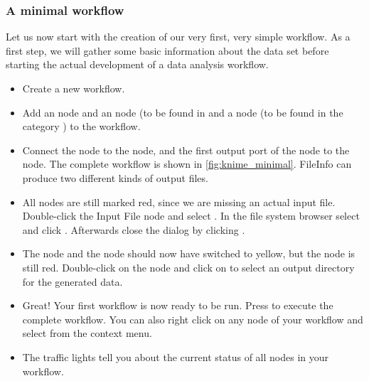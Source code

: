 \subsubsection{A minimal workflow}
\label{Minimal_Workflow}

Let us now start with the creation of our very first, very simple workflow.
As a first step, we will gather some basic information about the data set before starting the
actual development of a data analysis workflow.

\begin{itemize}
\item
Create a new workflow.
\item Add an  node and an  node (to be found in  and a  node (to be found in the category ) to the workflow.
\item Connect the  node to the  node, and the first output port of the  node to the  node.
The complete workflow is shown in \cref{fig:knime_minimal}.
FileInfo can produce two different kinds of output files.
\item All nodes are still marked red, since we are missing an actual input file.
Double-click the Input File node and select .
In the file system browser select  and click .
Afterwards close the dialog by clicking .
\item The  node and the  node should now have switched to yellow, but the  node is still red.
Double-click on the  node and click on  to select an output directory for the generated data.
\item Great! Your first workflow is now ready to be run. Press  to execute the complete workflow.
You can also right click on any node of your workflow and select  from the context menu.
\item The traffic lights tell you about the current status of all nodes in your workflow.

\end{itemize}
